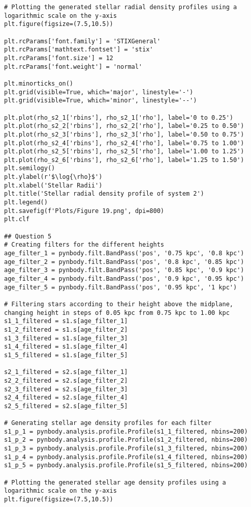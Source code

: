 \documentclass[12pt, a4paper]{article}
\begin{document}
\begin{lstlisting}[language=iPython]
# Plotting the generated stellar radial density profiles using a logarithmic scale on the y-axis
plt.figure(figsize=(7.5,10.5))

plt.rcParams['font.family'] = 'STIXGeneral'
plt.rcParams['mathtext.fontset'] = 'stix'
plt.rcParams['font.size'] = 12
plt.rcParams['font.weight'] = 'normal'

plt.minorticks_on()
plt.grid(visible=True, which='major', linestyle='-')
plt.grid(visible=True, which='minor', linestyle='--')

plt.plot(rho_s2_1['rbins'], rho_s2_1['rho'], label='0 to 0.25') 
plt.plot(rho_s2_2['rbins'], rho_s2_2['rho'], label='0.25 to 0.50')
plt.plot(rho_s2_3['rbins'], rho_s2_3['rho'], label='0.50 to 0.75')
plt.plot(rho_s2_4['rbins'], rho_s2_4['rho'], label='0.75 to 1.00')
plt.plot(rho_s2_5['rbins'], rho_s2_5['rho'], label='1.00 to 1.25')
plt.plot(rho_s2_6['rbins'], rho_s2_6['rho'], label='1.25 to 1.50')
plt.semilogy()
plt.ylabel(r'$\log{\rho}$')
plt.xlabel('Stellar Radii')
plt.title('Stellar radial density profile of system 2')
plt.legend()
plt.savefig(f'Plots/Figure 19.png', dpi=800)
plt.clf

## Question 5
# Creating filters for the different heights
age_filter_1 = pynbody.filt.BandPass('pos', '0.75 kpc', '0.8 kpc')
age_filter_2 = pynbody.filt.BandPass('pos', '0.8 kpc', '0.85 kpc')
age_filter_3 = pynbody.filt.BandPass('pos', '0.85 kpc', '0.9 kpc')
age_filter_4 = pynbody.filt.BandPass('pos', '0.9 kpc', '0.95 kpc')
age_filter_5 = pynbody.filt.BandPass('pos', '0.95 kpc', '1 kpc')

# Filtering stars according to their height above the midplane, changing height in steps of 0.05 kpc from 0.75 kpc to 1.00 kpc
s1_1_filtered = s1.s[age_filter_1]
s1_2_filtered = s1.s[age_filter_2]
s1_3_filtered = s1.s[age_filter_3]
s1_4_filtered = s1.s[age_filter_4]
s1_5_filtered = s1.s[age_filter_5]

s2_1_filtered = s2.s[age_filter_1]
s2_2_filtered = s2.s[age_filter_2]
s2_3_filtered = s2.s[age_filter_3]
s2_4_filtered = s2.s[age_filter_4]
s2_5_filtered = s2.s[age_filter_5]

# Generating stellar age density profiles for each filter
s1_p_1 = pynbody.analysis.profile.Profile(s1_1_filtered, nbins=200)
s1_p_2 = pynbody.analysis.profile.Profile(s1_2_filtered, nbins=200)
s1_p_3 = pynbody.analysis.profile.Profile(s1_3_filtered, nbins=200)
s1_p_4 = pynbody.analysis.profile.Profile(s1_4_filtered, nbins=200)
s1_p_5 = pynbody.analysis.profile.Profile(s1_5_filtered, nbins=200)

# Plotting the generated stellar age density profiles using a logarithmic scale on the y-axis
plt.figure(figsize=(7.5,10.5))


\end{lstlisting}
\end{document}
